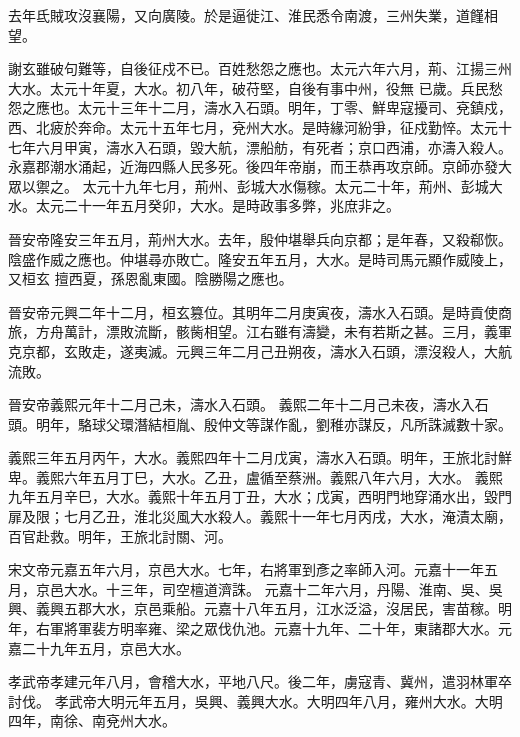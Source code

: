 \begin{pinyinscope}
 去年氐賊攻沒襄陽，又向廣陵。於是逼徙江、淮民悉令南渡，三州失業，道饉相望。



 謝玄雖破句難等，自後征戍不已。百姓愁怨之應也。太元六年六月，荊、江揚三州大水。太元十年夏，大水。初八年，破苻堅，自後有事中州，役無
 已歲。兵民愁怨之應也。太元十三年十二月，濤水入石頭。明年，丁零、鮮卑寇擾司、兗鎮戍，西、北疲於奔命。太元十五年七月，兗州大水。是時緣河紛爭，征戍勤悴。太元十七年六月甲寅，濤水入石頭，毀大航，漂船舫，有死者；京口西浦，亦濤入殺人。永嘉郡潮水涌起，近海四縣人民多死。後四年帝崩，而王恭再攻京師。京師亦發大眾以禦之。
 太元十九年七月，荊州、彭城大水傷稼。太元二十年，荊州、彭城大水。太元二十一年五月癸卯，大水。是時政事多弊，兆庶非之。



 晉安帝隆安三年五月，荊州大水。去年，殷仲堪舉兵向京都；是年春，又殺郗恢。陰盛作威之應也。仲堪尋亦敗亡。隆安五年五月，大水。是時司馬元顯作威陵上，又桓玄
 擅西夏，孫恩亂東國。陰勝陽之應也。



 晉安帝元興二年十二月，桓玄篡位。其明年二月庚寅夜，濤水入石頭。是時貢使商旅，方舟萬計，漂敗流斷，骸胔相望。江右雖有濤變，未有若斯之甚。三月，義軍克京都，玄敗走，遂夷滅。元興三年二月己丑朔夜，濤水入石頭，漂沒殺人，大航流敗。



 晉安帝義熙元年十二月己未，濤水入石頭。
 義熙二年十二月己未夜，濤水入石頭。明年，駱球父環潛結桓胤、殷仲文等謀作亂，劉稚亦謀反，凡所誅滅數十家。



 義熙三年五月丙午，大水。義熙四年十二月戊寅，濤水入石頭。明年，王旅北討鮮卑。義熙六年五月丁巳，大水。乙丑，盧循至蔡洲。義熙八年六月，大水。
 義熙九年五月辛巳，大水。義熙十年五月丁丑，大水；戊寅，西明門地穿涌水出，毀門扉及限；七月乙丑，淮北災風大水殺人。義熙十一年七月丙戌，大水，淹漬太廟，百官赴救。明年，王旅北討關、河。



 宋文帝元嘉五年六月，京邑大水。七年，右將軍到彥之率師入河。元嘉十一年五月，京邑大水。十三年，司空檀道濟誅。
 元嘉十二年六月，丹陽、淮南、吳、吳興、義興五郡大水，京邑乘船。元嘉十八年五月，江水泛溢，沒居民，害苗稼。明年，右軍將軍裴方明率雍、梁之眾伐仇池。元嘉十九年、二十年，東諸郡大水。元嘉二十九年五月，京邑大水。



 孝武帝孝建元年八月，會稽大水，平地八尺。後二年，虜寇青、冀州，遣羽林軍卒討伐。
 孝武帝大明元年五月，吳興、義興大水。大明四年八月，雍州大水。大明四年，南徐、南兗州大水。




\end{pinyinscope}
